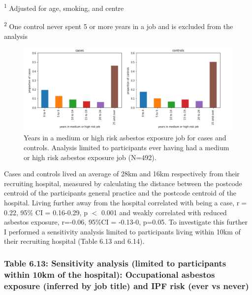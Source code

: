 \textsuperscript{1} Adjusted for age, smoking, and centre

\textsuperscript{2} One control never spent 5 or more years in a job and
is excluded from the analysis

\begin{figure}
\centering
\includegraphics{source/figures/years.png}
\caption{Years in a medium or high risk asbestos exposure job for cases
and controls. Analysis limited to participants ever having had a medium
or high risk asbestos exposure job (N=492).}
\end{figure}

Cases and controls lived an average of 28km and 16km respectively from
their recruiting hospital, measured by calculating the distance between
the postcode centroid of the participants general practice and the
postcode centroid of the hospital. Living further away from the hospital
correlated with being a case, r\ensuremath{=}0.22, 95\% CI = 0.16-0.29,
p \ensuremath{<} 0.001 and weakly correlated with reduced asbestos
exposure, r=-0.06, 95\%CI = -0.13-0, p=0.05. To investigate this further
I performed a sensitivity analysis limited to participants living within
10km of their recruiting hospital (Table 6.13 and 6.14).

\hypertarget{table-6.13-sensitivity-analysis-limited-to-participants-within-10km-of-the-hospital-occupational-asbestos-exposure-inferred-by-job-title-and-ipf-risk-ever-vs-never}{%
\subsubsection{Table 6.13: Sensitivity analysis (limited to participants
within 10km of the hospital): Occupational asbestos exposure (inferred
by job title) and IPF risk (ever vs
never)}\label{table-6.13-sensitivity-analysis-limited-to-participants-within-10km-of-the-hospital-occupational-asbestos-exposure-inferred-by-job-title-and-ipf-risk-ever-vs-never}}


